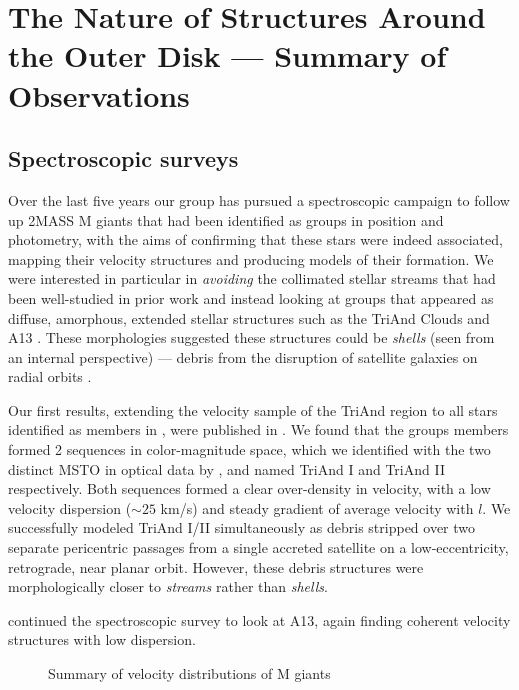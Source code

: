 \documentclass[galaxies,article,submit,moreauthors,pdftex,10pt,a4paper]{mdpi}
\begin{document}
\section{The Nature of Structures Around the Outer Disk --- Summary of Observations}
\label{sec:obs}
\subsection{Spectroscopic surveys}

Over the last five years our group has pursued a spectroscopic campaign to follow up 2MASS M giants that had been identified as groups in position and photometry, with the aims of confirming that these stars were indeed associated, mapping their velocity structures and producing models of their formation.
We were interested in particular in {\it avoiding} the collimated stellar streams that had been well-studied in prior work \citep[such as Sgr, Orphan, GD1 and Pla 5 --- see, e.g.,][]{law10,koposov10,kuepper15,bovy16}
and instead looking at groups that appeared as diffuse, amorphous, extended stellar structures such as the TriAnd Clouds \citep{rochapinto04} and A13 \citep{sharma10}.
These morphologies suggested these structures could be  {\it shells} (seen from an internal perspective) --- debris from the disruption of satellite galaxies on radial orbits \citep{johnston08}.

Our first results, extending the \cite{rochapinto04} velocity sample of the TriAnd region to all stars identified as members in \cite{sharma10}, were published in  \cite{sheffield14}.
We found that the groups members formed 2 sequences in color-magnitude space, which we identified with the two distinct MSTO in optical data by \cite{martin07}, and named TriAnd I and TriAnd II respectively.
Both sequences formed a clear over-density in velocity, with a low velocity dispersion ($\sim 25$ km/s)  and steady gradient of average velocity with $l$.
We successfully modeled TriAnd I/II simultaneously as debris stripped over two separate pericentric passages from a single accreted satellite on a low-eccentricity, retrograde, near planar orbit.
However, these debris structures were morphologically closer to {\it streams} rather than {\it shells}.

\cite{li17} continued the spectroscopic survey to look at A13, again finding coherent velocity structures with low dispersion.

\begin{figure}[t]
\centering
\caption{\label{fig:ting_vel}
Summary of velocity distributions of M giants}
\end{figure}
\end{document}

